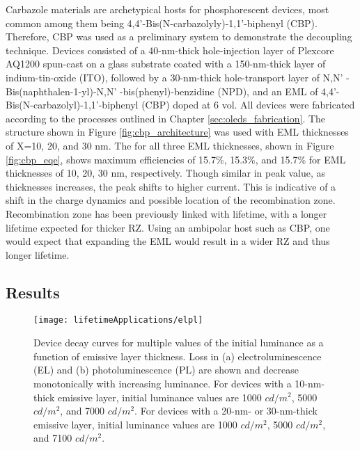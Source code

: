 \documentclass[../thesis.tex]{subfiles}
\begin{document}
Carbazole materials are archetypical hosts for phosphorescent devices, most common among them being 4,4'-Bis(N-carbazolyly)-1,1'-biphenyl (CBP).\supercite{Han2014,OBrien1999a,Cho2014,Price2015,Adachi2001,Watanabe2007,Holmes2003,Adamovich2003}
Therefore, CBP was used as a preliminary system to demonstrate the decoupling technique.
Devices consisted of a 40-nm-thick hole-injection layer of Plexcore AQ1200 spun-cast on a glass substrate coated with a 150-nm-thick layer of  indium-tin-oxide (ITO), followed by a 30-nm-thick hole-transport layer of N,N' -Bis(naphthalen-1-yl)-N,N' -bis(phenyl)-benzidine (NPD), and an EML of 4,4'-Bis(N-carbazolyl)-1,1'-biphenyl (CBP) doped at 6 vol. %
All devices were fabricated according to the processes outlined in Chapter \ref{sec:oleds_fabrication}.
The structure shown in Figure \ref{fig:cbp_architecture} was used with EML thicknesses of X=10, 20, and 30 nm.
The \eqe for all three EML thicknesses, shown in Figure \ref{fig:cbp_eqe}, shows maximum efficiencies of 15.7\%, 15.3\%, and 15.7\% for EML thicknesses of 10, 20, 30 nm, respectively.
Though similar in peak value, as thicknesses increases, the peak \eqe shifts to higher current.
This is indicative of a shift in the charge dynamics and possible location of the recombination zone.
Recombination zone has been previously linked with lifetime, with a longer lifetime expected for thicker RZ.\supercite{Zhang2014,Wu2016,Chin2005,Lee2006,Chwang2002,Han2016,Lee2005a,Brown2004,Choong2000,Liu2004}
Using an ambipolar host such as CBP, one would expect that expanding the EML would result in a wider RZ and thus longer lifetime.

\subsection{Results}

\begin{figure}[ht]
\centering
\texttt{[image: lifetimeApplications/elpl]}
\caption{Device decay curves for multiple values of the initial luminance as a function of emissive layer thickness.  Loss in (a) electroluminescence (EL) and (b) photoluminescence (PL) are shown and decrease monotonically with increasing luminance.  For devices with a 10-nm-thick emissive layer, initial luminance values are 1000 $cd/m^2$, 5000 $cd/m^2$, and 7000 $cd/m^2$.  For devices with a 20-nm- or 30-nm-thick emissive layer, initial luminance values are 1000 $cd/m^2$, 5000 $cd/m^2$, and 7100 $cd/m^2$. }
\label{fig:cbp_elpl}
\end{figure}
\end{document}
